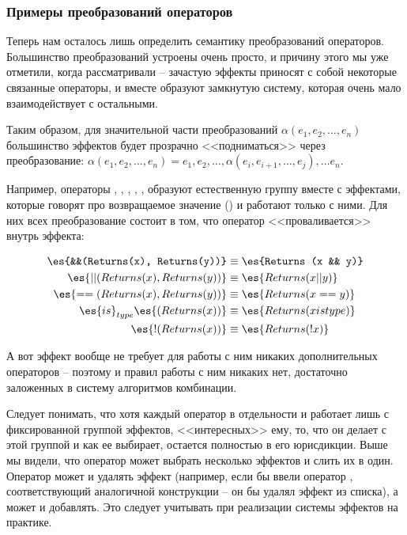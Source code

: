 \subsubsection{Примеры преобразований операторов}

Теперь нам осталось лишь определить семантику преобразований операторов. Большинство преобразований устроены очень просто, и причину этого мы уже отметили, когда рассматривали  -- зачастую эффекты приносят с собой некоторые связанные операторы, и вместе образуют замкнутую систему, которая очень мало взаимодействует с остальными. 

Таким образом, для значительной части преобразований $\alpha(e_1, e_2, \ldots, e_n)$ большинство эффектов будет прозрачно <<подниматься>> через преобразование: $\alpha(e_1, e_2, \ldots, e_n) = e_1, e_2, \ldots, \alpha(e_i, e_{i + 1}, \ldots, e_j), \ldots e_n$.

Например, операторы \code{\&\&}, \code{||}, \code{==}, , \code{!},  образуют естественную группу вместе с эффектами, которые говорят про возвращаемое значение () и работают только с ними. Для них всех преобразование состоит в том, что оператор <<проваливается>> внутрь эффекта: 

\[
\begin{aligned}
	\es{&&(Returns(x), Returns(y))} & \equiv \es{Returns (x && y)}    \\
	\es{||(Returns(x), Returns(y))}   & \equiv \es{Returns (x || y)}    \\
	\es{==(Returns(x), Returns(y))}   & \equiv \es{Returns (x == y)}    \\
	\es{is}_{type} \es{(Returns(x))}  & \equiv \es{Returns (x is type)} \\
	\es{!(Returns(x))} 				  & \equiv \es{Returns (!x)}
\end{aligned}
\]

А вот эффект  вообще не требует для работы с ним никаких дополнительных операторов -- поэтому и правил работы с ним никаких нет, достаточно заложенных в систему алгоритмов комбинации. 

Следует понимать, что хотя каждый оператор в отдельности и работает лишь с фиксированной группой эффектов, <<интересных>> ему, то, что он делает с этой группой и как ее выбирает, остается полностью в его юрисдикции. Выше мы видели, что оператор может выбрать несколько эффектов и слить их в один. Оператор может и удалять эффект (например, если бы ввели оператор , соответствующий аналогичной конструкции -- он бы удалял эффект  из списка), а может и добавлять. Это следует учитывать при реализации системы эффектов на практике.



